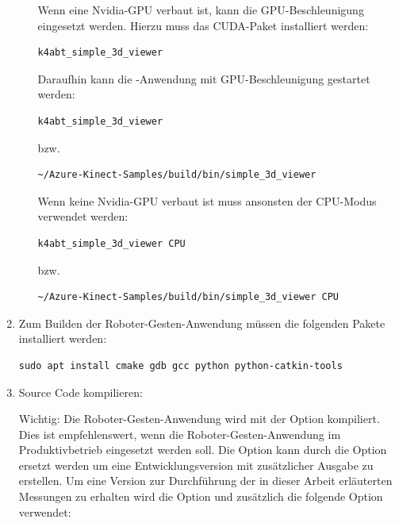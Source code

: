 \begin{enumerate}[label*=\arabic*.]
\begin{enumerate}[label*=\arabic*.]
                Wenn eine Nvidia-GPU verbaut ist, kann die GPU-Beschleunigung eingesetzt werden. Hierzu muss das CUDA-Paket installiert werden:
                \begin{lstlisting}[style=bash]
k4abt_simple_3d_viewer
                \end{lstlisting}

                Daraufhin kann die -Anwendung mit GPU-Beschleunigung gestartet werden:
                \begin{lstlisting}[style=bash]
k4abt_simple_3d_viewer
                \end{lstlisting}

                bzw.

                \begin{lstlisting}[style=bash]
~/Azure-Kinect-Samples/build/bin/simple_3d_viewer
                \end{lstlisting}

                Wenn keine Nvidia-GPU verbaut ist muss ansonsten der CPU-Modus verwendet werden:
                \begin{lstlisting}[style=bash]
k4abt_simple_3d_viewer CPU
                \end{lstlisting}

                bzw.

                \begin{lstlisting}[style=bash]
~/Azure-Kinect-Samples/build/bin/simple_3d_viewer CPU
                \end{lstlisting}
        \end{enumerate}

    \item Zum Builden der Roboter-Gesten-Anwendung müssen die folgenden Pakete installiert werden:
        \begin{lstlisting}[style=bash]
sudo apt install cmake gdb gcc python python-catkin-tools
        \end{lstlisting}

    \item Source Code kompilieren:\\
        \begin{redbox}{Wichtig:}
            Die Roboter-Gesten-Anwendung wird mit der Option  kompiliert. Dies ist empfehlenswert, wenn die Roboter-Gesten-Anwendung im Produktivbetrieb eingesetzt werden soll. Die Option  kann durch die Option  ersetzt werden um eine Entwicklungsversion mit zusätzlicher Ausgabe zu erstellen. Um eine Version zur Durchführung der in dieser Arbeit erläuterten Messungen zu erhalten wird die Option  und zusätzlich die folgende Option verwendet:


\end{redbox}
\end{enumerate}
